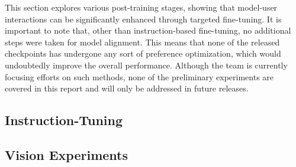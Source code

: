 This section explores various post-training stages, showing that model-user interactions can be significantly enhanced through targeted fine-tuning. It is important to note that, other than instruction-based fine-tuning, no additional steps were taken for model alignment. This means that none of the released checkpoints has undergone any sort of preference optimization, which would undoubtedly improve the overall performance.  Although the team is currently focusing efforts on such methods, none of the preliminary experiments are covered in this report and will only be addressed in future releases.

\subsection{Instruction-Tuning}
\label{subsec:instruct}


\subsection{Vision Experiments}
\label{subsec:vision}


% 